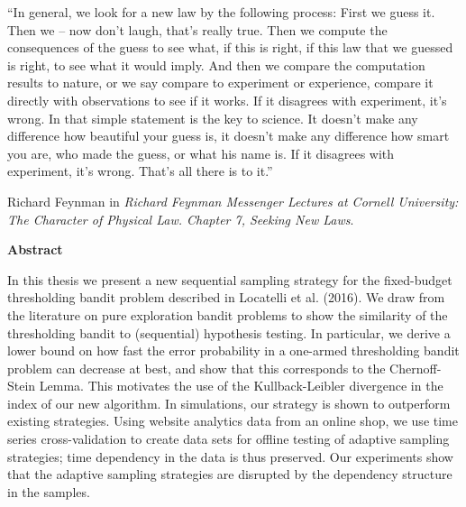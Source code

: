 \documentclass[11pt,]{article}
\begin{document}
``In general, we look for a new law by the following process: First we
guess it. Then we -- now don't laugh, that's really true. Then we
compute the consequences of the guess to see what, if this is right, if
this law that we guessed is right, to see what it would imply. And then
we compare the computation results to nature, or we say compare to
experiment or experience, compare it directly with observations to see
if it works. If it disagrees with experiment, it's wrong. In that simple
statement is the key to science. It doesn't make any difference how
beautiful your guess is, it doesn't make any difference how smart you
are, who made the guess, or what his name is. If it disagrees with
experiment, it's wrong. That's all there is to it.''
\vspace*{1.5\baselineskip}

Richard Feynman in \emph{Richard Feynman Messenger Lectures at Cornell
University: The Character of Physical Law. Chapter 7, Seeking New Laws}.

\newpage

\vspace*{10\baselineskip}

\Large{\bf Abstract\\}

\vspace*{1\baselineskip}

\normalsize
In this thesis we present a new sequential sampling strategy for the
fixed-budget thresholding bandit problem described in Locatelli et al.
(2016). We draw from the literature on pure exploration bandit problems
to show the similarity of the thresholding bandit to (sequential)
hypothesis testing. In particular, we derive a lower bound on how fast
the error probability in a one-armed thresholding bandit problem can
decrease at best, and show that this corresponds to the Chernoff-Stein
Lemma. This motivates the use of the Kullback-Leibler divergence in the
index of our new algorithm. In simulations, our strategy is shown to
outperform existing strategies. Using website analytics data from an
online shop, we use time series cross-validation to create data sets for
offline testing of adaptive sampling strategies; time dependency in the
data is thus preserved. Our experiments show that the adaptive sampling
strategies are disrupted by the dependency structure in the samples.

\newpage

\setcounter{tocdepth}{2} \tableofcontents

\newpage
\end{document}
